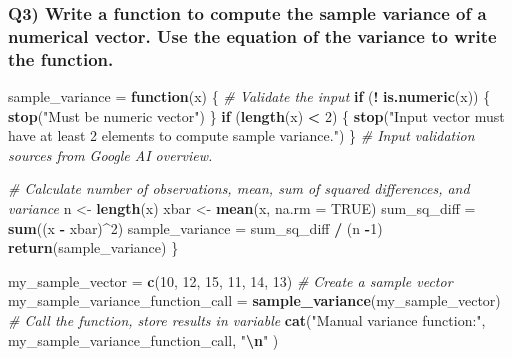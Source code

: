 \documentclass[
]{article}
\newenvironment{Shaded}{\begin{snugshade}}{\end{snugshade}}
\newcommand{\AttributeTok}[1]{\textcolor[rgb]{0.13,0.29,0.53}{#1}}
\newcommand{\CommentTok}[1]{\textcolor[rgb]{0.56,0.35,0.01}{\textit{#1}}}
\newcommand{\ConstantTok}[1]{\textcolor[rgb]{0.56,0.35,0.01}{#1}}
\newcommand{\ControlFlowTok}[1]{\textcolor[rgb]{0.13,0.29,0.53}{\textbf{#1}}}
\newcommand{\DecValTok}[1]{\textcolor[rgb]{0.00,0.00,0.81}{#1}}
\newcommand{\FunctionTok}[1]{\textcolor[rgb]{0.13,0.29,0.53}{\textbf{#1}}}
\newcommand{\NormalTok}[1]{#1}
\newcommand{\OtherTok}[1]{\textcolor[rgb]{0.56,0.35,0.01}{#1}}
\newcommand{\SpecialCharTok}[1]{\textcolor[rgb]{0.81,0.36,0.00}{\textbf{#1}}}
\newcommand{\StringTok}[1]{\textcolor[rgb]{0.31,0.60,0.02}{#1}}
\begin{document}
\subsubsection{Q3) Write a function to compute the sample variance of a
numerical vector. Use the equation of the variance to write the
function.}\label{q3-write-a-function-to-compute-the-sample-variance-of-a-numerical-vector.-use-the-equation-of-the-variance-to-write-the-function.}

\begin{Shaded}
\begin{Highlighting}[]
\NormalTok{sample\_variance }\OtherTok{=} \ControlFlowTok{function}\NormalTok{(x) \{}
  \CommentTok{\# Validate the input}
  \ControlFlowTok{if}\NormalTok{ (}\SpecialCharTok{!} \FunctionTok{is.numeric}\NormalTok{(x)) \{}
    \FunctionTok{stop}\NormalTok{(}\StringTok{"Must be numeric vector"}\NormalTok{)}
\NormalTok{  \}}
  \ControlFlowTok{if}\NormalTok{ (}\FunctionTok{length}\NormalTok{(x) }\SpecialCharTok{\textless{}} \DecValTok{2}\NormalTok{) \{}
    \FunctionTok{stop}\NormalTok{(}\StringTok{"Input vector must have at least 2 elements to compute sample variance."}\NormalTok{)}
\NormalTok{  \}}
  \CommentTok{\# Input validation sources from Google AI overview.}
  
  \CommentTok{\# Calculate number of observations, mean, sum of squared differences, and variance}
\NormalTok{  n }\OtherTok{\textless{}{-}} \FunctionTok{length}\NormalTok{(x)}
\NormalTok{  xbar }\OtherTok{\textless{}{-}} \FunctionTok{mean}\NormalTok{(x, }\AttributeTok{na.rm =} \ConstantTok{TRUE}\NormalTok{)}
\NormalTok{  sum\_sq\_diff }\OtherTok{=} \FunctionTok{sum}\NormalTok{((x }\SpecialCharTok{{-}}\NormalTok{ xbar)}\SpecialCharTok{\^{}}\DecValTok{2}\NormalTok{)}
\NormalTok{  sample\_variance }\OtherTok{=}\NormalTok{ sum\_sq\_diff }\SpecialCharTok{/}\NormalTok{ (n }\SpecialCharTok{{-}}\DecValTok{1}\NormalTok{)}
  \FunctionTok{return}\NormalTok{(sample\_variance)}
\NormalTok{\}}


\NormalTok{my\_sample\_vector }\OtherTok{=} \FunctionTok{c}\NormalTok{(}\DecValTok{10}\NormalTok{, }\DecValTok{12}\NormalTok{, }\DecValTok{15}\NormalTok{, }\DecValTok{11}\NormalTok{, }\DecValTok{14}\NormalTok{, }\DecValTok{13}\NormalTok{) }\CommentTok{\# Create a sample vector}
\NormalTok{my\_sample\_variance\_function\_call }\OtherTok{=} \FunctionTok{sample\_variance}\NormalTok{(my\_sample\_vector) }\CommentTok{\# Call the function, store results in variable}
\FunctionTok{cat}\NormalTok{(}\StringTok{"Manual variance function:"}\NormalTok{, my\_sample\_variance\_function\_call, }\StringTok{"}\SpecialCharTok{\textbackslash{}n}\StringTok{"}\NormalTok{ )}
\end{Highlighting}
\end{Shaded}
\end{document}

